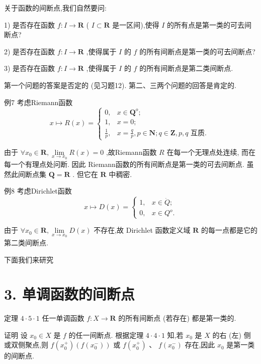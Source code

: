 关于函数的间断点,我们自然要问:

1) 是否存在函数 $f : I \rightarrow  \mathbf{R}$ ( $I \subset  \mathbf{R}$ 是一区间),使得 $I$ 的所有点是第一类的可去间断点?

2) 是否存在函数 $f : I \rightarrow  \mathbf{R}$ ,使得属于 $I$ 的 $f$ 的所有间断点是第一类的可去间断点?

3) 是否存在函数 $f : I \rightarrow  \mathbf{R}$ ,使得属于 $I$ 的 $f$ 的所有间断点是第二类间断点.

第一个问题的答案是否定的 (见习题12). 第二、三两个问题的回答是肯定的.

例7 考虑Riemann函数
$$x \mapsto  R\left( x\right)  = \left\{  \begin{array}{ll} 0, & x \in  {\mathbf{Q}}^{o}; \\  1, & x = 0; \\  \frac{1}{p}, & x = \frac{q}{p},p \in  \mathbf{N};q \in  \mathbf{Z},p,q\text{ 互质. } \end{array}\right.$$

由于 $\forall {x}_{0} \in  \mathbf{R},\mathop{\lim }\limits_{{x \rightarrow  {x}_{0}}}R\left( x\right)  = 0$ ,故Riemann函数 $R$ 在每一个无理点处连续, 而在每一个有理点处问断. 因此 Riemann函数的所有间断点是第一类的可去间断点. 虽然此间断点集 $\mathbf{Q} = \mathbf{R}$ . 但它在 $\mathbf{R}$ 中稠密.

例8 考虑Dirichlet函数
$$x \mapsto  D\left( x\right)  = \left\{  \begin{array}{ll} 1, & x \in  \dot{Q}; \\  0, & x \in  {Q}^{o}. \end{array}\right.$$

由于 $\forall {x}_{0} \in  \mathbf{R},\mathop{\lim }\limits_{{x \rightarrow  {x}_{0}}}D\left( x\right)$ 不存在,故 Dirichlet 函数定义域 $\mathbf{R}$ 的每一点都是它的第二类间断点.

下面我们来研究

\section*{3. 单调函数的间断点}

定理 $4 \cdot  5 \cdot  1$ 任一单调函数 $f : X \rightarrow  \mathbf{R}$ 的所有间断点 (若存在) 都是第一类的.

证明 设 ${x}_{0} \in  X$ 是 $f$ 的任一间断点. 根据定理 $4 \cdot  4 \cdot  1$ 知,若 ${x}_{0}$ 是 $X$ 的右 (左) 侧或双侧聚点,则 $f\left( {x}_{0}^{ + }\right) \left( {f\left( {x}_{0}^{ - }\right) }\right)$ 或 $f\left( {x}_{0}^{ + }\right) \text{ 、 }f\left( {x}_{0}^{ - }\right)$ 存在,因此 ${x}_{0}$ 是第一类的间断点.

